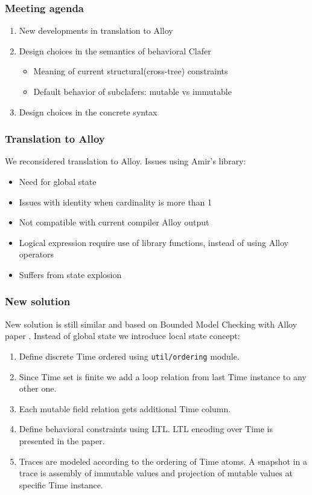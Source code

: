 \documentclass[xcolor=dvipsnames,12pt]{beamer}
\author{Paulius and Bogdan}
\date{May 29, 2013}
\newcommand\Fontvi{\fontsize{14}{14}\selectfont}
\begin{document}
  \begin{frame}
    \frametitle{Meeting agenda}
    \Fontvi
    \begin{enumerate}
      \item New developments in translation to Alloy
      \item Design choices in the semantics of behavioral Clafer
        \begin{itemize}
          \item Meaning of current structural(cross-tree) constraints
          \item Default behavior of subclafers: mutable vs immutable
        \end{itemize}
      \item{Design choices in the concrete syntax}
    \end{enumerate}
  \end{frame}

  \begin{frame}
    \frametitle{Translation to Alloy}
    We reconsidered translation to Alloy. Issues using Amir's library:
    \begin{itemize}
      \item{Need for global state}
      \item{Issues with identity when cardinality is more than 1}
      \item{Not compatible with current compiler Alloy output}
      \item{Logical expression require use of library functions, instead of using Alloy operators}
      \item{Suffers from state explosion}
    \end{itemize}

  \end{frame}

  \begin{frame}
    \frametitle{New solution}
    New solution is still similar and based on Bounded Model Checking with Alloy paper . Instead of global state we introduce local state concept:
    \begin{enumerate}
      \item{Define discrete Time ordered using \lstinline{util/ordering} module.}
      \item{Since Time set is finite we add a loop relation from last Time instance to any other one.}
      \item{Each mutable field relation gets additional Time column.}
      \item{Define behavioral constraints using LTL. LTL encoding over Time is presented in the paper.}
      \item{Traces are modeled according to the ordering of Time atoms. A snapshot in a trace is assembly of immutable values and projection of mutable values at specific Time instance.}
    \end{enumerate}
  \end{frame}
\end{document}
